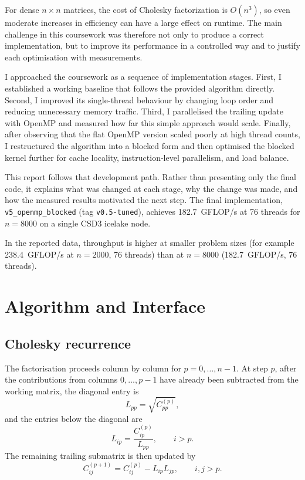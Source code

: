 \documentclass{article}
\begin{document}
For dense \(n \times n\) matrices, the cost of Cholesky factorization is
\(O(n^3)\), so even moderate increases in efficiency can have a large effect on
runtime. The main challenge in this coursework was therefore not only to
produce a correct implementation, but to improve its performance in a controlled
way and to justify each optimisation with measurements.

I approached the coursework as a sequence of implementation stages. First, I
established a working baseline that follows the provided algorithm directly.
Second, I improved its single-thread behaviour by changing loop order and
reducing unnecessary memory traffic. Third, I parallelised the trailing update
with OpenMP and measured how far this simple approach would scale. Finally,
after observing that the flat OpenMP version scaled poorly at high thread
counts, I restructured the algorithm into a blocked form and then optimised the
blocked kernel further for cache locality, instruction-level parallelism, and
load balance.

This report follows that development path. Rather than presenting only the
final code, it explains what was changed at each stage, why the change was made,
and how the measured results motivated the next step. The final implementation,
\texttt{v5\_openmp\_blocked} (tag \texttt{v0.5-tuned}), achieves
182.7~GFLOP/s at 76 threads for \(n=8000\) on a single CSD3 icelake node.

In the reported data, throughput is higher at smaller problem sizes
(for example 238.4~GFLOP/s at \(n=2000\), 76 threads) than at
\(n=8000\) (182.7~GFLOP/s, 76 threads).
\section{Algorithm and Interface}

\subsection{Cholesky recurrence}

The factorisation proceeds column by column for \(p = 0, \ldots, n-1\).
At step \(p\), after the contributions from columns \(0,\ldots,p-1\) have
already been subtracted from the working matrix, the diagonal entry is
\begin{equation}
  L_{pp} = \sqrt{C_{pp}^{(p)}},
\end{equation}
and the entries below the diagonal are
\begin{equation}
  L_{ip} = \frac{C_{ip}^{(p)}}{L_{pp}}, \qquad i > p.
\end{equation}
The remaining trailing submatrix is then updated by
\begin{equation}
  C_{ij}^{(p+1)} = C_{ij}^{(p)} - L_{ip}L_{jp}, \qquad i,j > p.
\end{equation}
\end{document}

